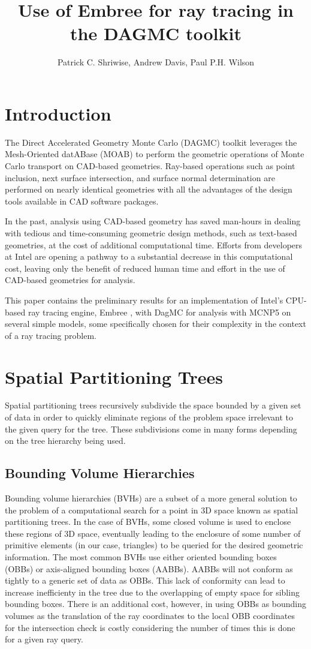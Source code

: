 \documentclass{anstrans}
\title{Use of Embree for ray tracing in the DAGMC toolkit}
\author{Patrick C. Shriwise, Andrew Davis, Paul P.H. Wilson}
\institute{University of Wisconsin-Madison, 1500 Engineering Dr, Madison, WI 53706, shriwise@wisc.edu}
\begin{document}
\section{Introduction}

The Direct Accelerated Geometry Monte Carlo (DAGMC) \cite{dagmc_2009} toolkit leverages the Mesh-Oriented datABase (MOAB) \cite{moab} to perform the geometric operations of Monte Carlo transport on CAD-based geometries. Ray-based operations such as point inclusion, next surface intersection, and surface normal determination are performed on nearly identical geometries with all the advantages of the design tools available in CAD software packages.

In the past, analysis using CAD-based geometry has saved man-hours in dealing with tedious and time-consuming geometric design methods, such as text-based geometries, at the cost of additional computational time. Efforts from developers at Intel are opening a pathway to a substantial decrease in this computational cost, leaving only the benefit of reduced human time and effort in the use of CAD-based geometries for analysis. 

This paper contains the preliminary results for an implementation of Intel's CPU-based ray tracing engine, Embree \cite{embree}, with DagMC for analysis with MCNP5 \cite{mcnp5} on several simple models, some specifically chosen for their complexity in the context of a ray tracing problem.

\section{Spatial Partitioning Trees}

Spatial partitioning trees recursively subdivide the space bounded by a given set of data in order to quickly eliminate regions of the problem space irrelevant to the given query for the tree. These subdivisions come in many forms depending on the tree hierarchy being used. 


\subsection{Bounding Volume Hierarchies}

Bounding volume hierarchies (BVHs) are a subset of a more general solution to the problem of a computational search for a point in 3D space known as spatial partitioning trees. In the case of BVHs, some closed volume is used to enclose these regions of 3D space, eventually leading to the enclosure of some number of primitive elements (in our case, triangles) to be queried for the desired geometric information. The most common BVHs use either oriented bounding boxes (OBBs) or axis-aligned bounding boxes (AABBs). AABBs will not conform as tightly to a generic set of data as OBBs. This lack of conformity can lead to increase inefficienty in the tree due to the overlapping of empty space for sibling bounding boxes. There is an additional cost, however, in using OBBs as bounding volumes as the translation of the ray coordinates to the local OBB coordinates for the intersection check is costly considering the number of times this is done for a given ray query. 
\end{document}

